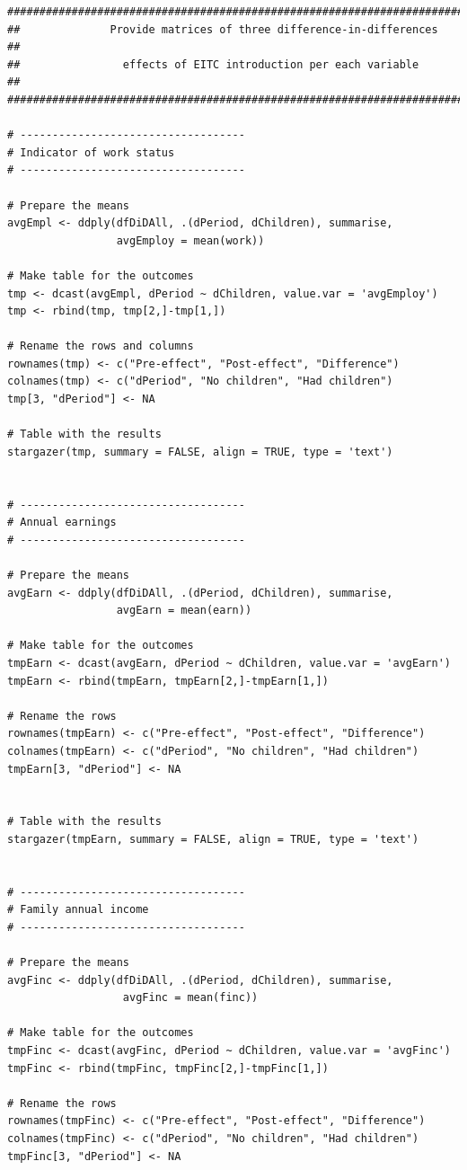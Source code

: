\documentclass{article}
\begin{document}
\begin{tiny}
\begin{verbatim}
##################################################################################
##              Provide matrices of three difference-in-differences             ##
##                effects of EITC introduction per each variable                ##
##################################################################################

# -----------------------------------
# Indicator of work status
# -----------------------------------

# Prepare the means
avgEmpl <- ddply(dfDiDAll, .(dPeriod, dChildren), summarise,
                 avgEmploy = mean(work))

# Make table for the outcomes
tmp <- dcast(avgEmpl, dPeriod ~ dChildren, value.var = 'avgEmploy')
tmp <- rbind(tmp, tmp[2,]-tmp[1,])

# Rename the rows and columns
rownames(tmp) <- c("Pre-effect", "Post-effect", "Difference")
colnames(tmp) <- c("dPeriod", "No children", "Had children")
tmp[3, "dPeriod"] <- NA

# Table with the results
stargazer(tmp, summary = FALSE, align = TRUE, type = 'text')


# -----------------------------------
# Annual earnings
# -----------------------------------

# Prepare the means
avgEarn <- ddply(dfDiDAll, .(dPeriod, dChildren), summarise,
                 avgEarn = mean(earn))

# Make table for the outcomes
tmpEarn <- dcast(avgEarn, dPeriod ~ dChildren, value.var = 'avgEarn')
tmpEarn <- rbind(tmpEarn, tmpEarn[2,]-tmpEarn[1,])

# Rename the rows
rownames(tmpEarn) <- c("Pre-effect", "Post-effect", "Difference")
colnames(tmpEarn) <- c("dPeriod", "No children", "Had children")
tmpEarn[3, "dPeriod"] <- NA


# Table with the results
stargazer(tmpEarn, summary = FALSE, align = TRUE, type = 'text')


# -----------------------------------
# Family annual income
# -----------------------------------

# Prepare the means
avgFinc <- ddply(dfDiDAll, .(dPeriod, dChildren), summarise,
                  avgFinc = mean(finc))

# Make table for the outcomes
tmpFinc <- dcast(avgFinc, dPeriod ~ dChildren, value.var = 'avgFinc')
tmpFinc <- rbind(tmpFinc, tmpFinc[2,]-tmpFinc[1,])

# Rename the rows
rownames(tmpFinc) <- c("Pre-effect", "Post-effect", "Difference")
colnames(tmpFinc) <- c("dPeriod", "No children", "Had children")
tmpFinc[3, "dPeriod"] <- NA



\end{verbatim}
\end{tiny}
\end{document}

